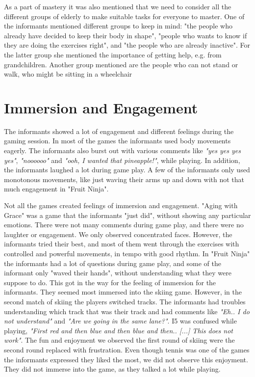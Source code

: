 As a part of mastery it was also mentioned that we need to consider all the different groups of elderly to make suitable tasks for everyone to master. One of the informants mentioned different groups to keep in mind: "the people who already have decided to keep their body in shape", "people who wants to know if they are doing the exercises right", and "the people who are already inactive". For the latter group she mentioned the importance of getting help, e.g. from grandchildren.  Another group mentioned are the people who can not stand or walk, who might be sitting in a wheelchair

\section{Immersion and Engagement}
The informants showed a lot of engagement and different feelings during the gaming session. In most of the games the informants used body movements eagerly. The informants also burst out with various comments like \emph{"yes yes yes yes"}, \emph{"noooooo"} and \emph{"ooh, I wanted that pineapple!"}, while playing. In addition, the informants laughed a lot during game play. A few of the informants only used monotonous movements, like just waving their arms up and down with not that much engagement in "Fruit Ninja".  

Not all the games created feelings of immersion and engagement. "Aging with Grace" was a game that the informants "just did", without showing any particular emotions. There were not many comments during game play, and there were no laughter or engagement. We only observed concentrated faces. However, the informants tried their best, and most of them went through the exercises with controlled and powerful movements, in tempo with good rhythm. In "Fruit Ninja" the informants had a lot of questions during game play, and some of the informant only "waved their hands", without understanding what they were suppose to do. This got in the way for the feeling of immersion for the informants. They seemed most immersed into the skiing game. However, in the second match of skiing the players switched tracks. The informants had troubles understanding which track that was their track and had comments like \emph{"Eh.. I do not understand"} and \emph{"Are we going in the same lane?"}. I5 was confused while playing, \emph{"First red and then blue and then blue and then.. [...] This does not work"}. The fun and enjoyment we observed the first round of skiing were the second round replaced with frustration. Even though tennis was one of the games the informants expressed they liked the most, we did not observe this enjoyment. They did not immerse into the game, as they talked a lot while playing. 

